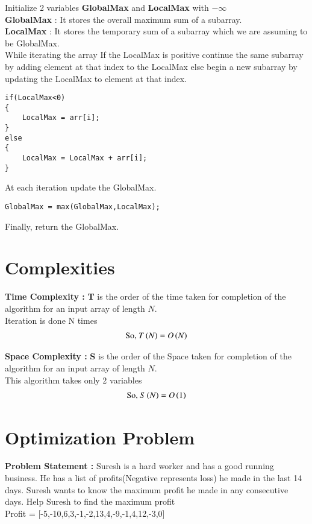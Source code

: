 \documentclass[journal,12pt,twocolumn]{IEEEtran}
\begin{document}
Initialize 2 variables \textbf{GlobalMax} and \textbf{LocalMax} with $-\infty$ \\
\textbf{GlobalMax} : It stores the overall maximum sum of a subarray. \\
\textbf{LocalMax} : It stores the temporary sum of a subarray which we are assuming to be GlobalMax.\\

While iterating the array If the LocalMax is positive continue the same subarray by adding element at that index to the LocalMax else begin a new subarray by updating the LocalMax to element at that index.\\

\begin{lstlisting}
if(LocalMax<0)
{
    LocalMax = arr[i];
}
else
{
    LocalMax = LocalMax + arr[i];
}
\end{lstlisting}

At each iteration update the GlobalMax.\\
\begin{lstlisting}
GlobalMax = max(GlobalMax,LocalMax);
\end{lstlisting}

Finally, return the GlobalMax.

\section{Complexities}

\textbf{Time Complexity :} \textbf{T} is the order of the time taken for completion of the algorithm for an input array of length $N$.\\
Iteration is done N times
\begin{align}
    \text{So, }T\left(N\right) = O\left(N\right)
\end{align}

\textbf{Space Complexity :}
\textbf{S} is the order of the Space taken for completion of the algorithm for an input array of length $N$.\\
This algorithm takes only 2 variables 
\begin{align}
    \text{So, }S\left(N\right) = O\left(1\right)
\end{align}

\section{Optimization Problem}
\textbf{Problem Statement :} Suresh is a hard worker and has a good running business. He has a list of profits(Negative represents loss) he made in the last 14 days. Suresh wants to know the maximum profit he made in any consecutive days. Help Suresh to find the maximum profit \\
Profit = [-5,-10,6,3,-1,-2,13,4,-9,-1,4,12,-3,0] \\
\end{document}
